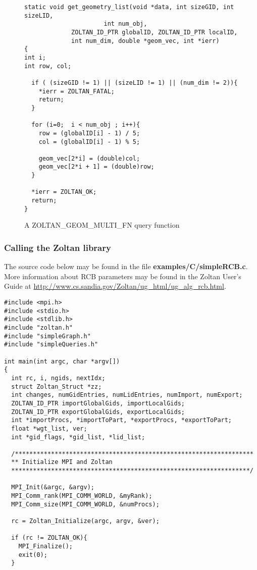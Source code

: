 \begin{figure}
\begin{flushleft}
\begin{verbatim}
static void get_geometry_list(void *data, int sizeGID, int sizeLID,
                      int num_obj,
             ZOLTAN_ID_PTR globalID, ZOLTAN_ID_PTR localID,
             int num_dim, double *geom_vec, int *ierr)
{
int i;
int row, col;
   
  if ( (sizeGID != 1) || (sizeLID != 1) || (num_dim != 2)){
    *ierr = ZOLTAN_FATAL; 
    return;
  }
    
  for (i=0;  i < num_obj ; i++){
    row = (globalID[i] - 1) / 5;
    col = (globalID[i] - 1) % 5;
  
    geom_vec[2*i] = (double)col;
    geom_vec[2*i + 1] = (double)row;
  }

  *ierr = ZOLTAN_OK;
  return;
} 
\end{verbatim}
\end{flushleft}
\caption{A ZOLTAN\_GEOM\_MULTI\_FN query function}
\label{fig:GeomMulti}
\end{figure}

\clearpage
\subsubsection{Calling the Zoltan library}

The source code below may be found in the file
\textbf{examples/C/simpleRCB.c}.
More information about RCB parameters
may be found in the Zoltan User's Guide at
\url{http://www.cs.sandia.gov/Zoltan/ug_html/ug_alg_rcb.html}.

\begin{flushleft}
\begin{verbatim}
#include <mpi.h>
#include <stdio.h>
#include <stdlib.h>
#include "zoltan.h"
#include "simpleGraph.h"
#include "simpleQueries.h"

int main(int argc, char *argv[])
{
  int rc, i, ngids, nextIdx;
  struct Zoltan_Struct *zz;
  int changes, numGidEntries, numLidEntries, numImport, numExport;
  ZOLTAN_ID_PTR importGlobalGids, importLocalGids;
  ZOLTAN_ID_PTR exportGlobalGids, exportLocalGids; 
  int *importProcs, *importToPart, *exportProcs, *exportToPart;
  float *wgt_list, ver;
  int *gid_flags, *gid_list, *lid_list;

  /******************************************************************
  ** Initialize MPI and Zoltan
  ******************************************************************/

  MPI_Init(&argc, &argv);
  MPI_Comm_rank(MPI_COMM_WORLD, &myRank);
  MPI_Comm_size(MPI_COMM_WORLD, &numProcs);

  rc = Zoltan_Initialize(argc, argv, &ver);

  if (rc != ZOLTAN_OK){
    MPI_Finalize();
    exit(0);
  }
\end{verbatim}
\end{flushleft}

